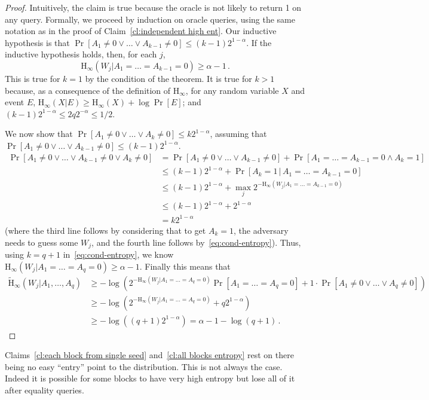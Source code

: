 \documentclass[11pt]{article}
\newcommand{\clref}[1]{\mbox{Claim~\ref{#1}}}
\newcommand{\Hoo}{\mathrm{H}_\infty}
\newcommand{\Hav}{\tilde{\mathrm{H}}_\infty}
\begin{document}
\begin{proof}
Intuitively, the claim is true because the oracle is not likely to return 1 on any query. Formally, we proceed by induction on oracle queries,
using the same notation as in the proof of   \clref{cl:independent high ent}. Our inductive hypothesis is
that $\Pr[A_1\neq 0 \vee \dots \vee A_{k-1}\neq 0] \leq (k-1)2^{1-\alpha}$.  If the inductive hypothesis holds, then, for each $j$,
\begin{equation}
\label{eq:cond-entropy}
\Hoo(W_j | A_1= \dots= A_{k-1}=0) \ge \alpha-1\,.
\end{equation}
This is true for $k=1$ by the condition of the theorem. It is true for $k>1$ because, as a consequence of the definition of $\Hoo$,
for any random variable $X$ and event $E$, $\Hoo(X|E)\ge \Hoo(X)+\log\Pr[E]$; and $(k-1) 2^{1-\alpha}\leq 2 q 2^{-\alpha} \leq 1/2$.

We now show that $\Pr[A_1\neq 0 \vee \dots \vee A_{k}\neq 0] \leq k 2^{1-\alpha}$, assuming that $\Pr[A_1\neq 0 \vee \dots \vee A_{k-1}\neq 0] \leq (k-1)2^{1-\alpha}$.
\begin{align*}
\Pr[A_1\neq 0 \vee \dots \vee A_{k-1}\neq 0 \vee A_k\neq 0] & =
\Pr[A_1\neq 0 \vee \dots \vee A_{k-1}\neq 0]+\Pr[A_1=\dots = A_{k-1}=0 \wedge A_k=1]\\
& \le  (k-1)2^{1-\alpha}+\Pr[A_k=1\,|\,A_1=\dots = A_{k-1}=0]\\
& \le  (k-1)2^{1-\alpha}+\max_j 2^{-\Hoo(W_j | A_1=\dots =A_{k-1}=0)}\\
& \le  (k-1)2^{1-\alpha}+ 2^{1-\alpha}\\
& = k 2^{1-\alpha}
\end{align*}
(where the third line follows by considering that to get $A_k=1$, the adversary needs to guess some $W_j$, and the fourth line follows by~\eqref{eq:cond-entropy}).
Thus, using $k=q+1$ in~\eqref{eq:cond-entropy},
 we know $\Hoo(W_j | A_1= \dots= A_q=0) \ge \alpha-1$.  Finally this means that
\begin{align*}
\Hav(W_j | A_1,\dots, A_q) &\ge -\log \left( 2^{-\Hoo(W_j | A_1= \dots= A_q=0)}\Pr[A_1=\dots=A_q=0]+1\cdot \Pr[A_1\neq 0 \vee \dots \vee  A_q\neq 0] \right)\\
& \ge -\log \left(  2^{-\Hoo(W_j | A_1= \dots= A_q=0)}+q2^{1-\alpha} \right)\\
& \ge -\log \left(  (q+1) 2^{1-\alpha}\right) = \alpha-1-\log(q+1)\,.
\end{align*}
\end{proof}

Claims~\ref{cl:each block from single seed} and~\ref{cl:all blocks entropy} rest on there being no easy ``entry'' point to the distribution.  This is not always the case.  Indeed it is possible for some blocks to have very high entropy but lose all of it after equality queries.
\end{document}
